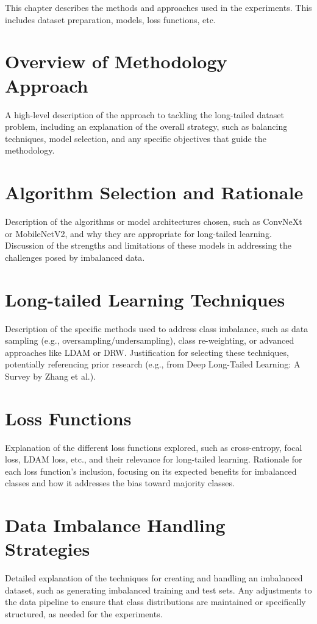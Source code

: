 
This chapter describes the methods and approaches used in the experiments. This includes dataset preparation, models, loss functions, etc.

\section{Overview of Methodology Approach}
A high-level description of the approach to tackling the long-tailed dataset problem, including an explanation of the overall strategy, 
such as balancing techniques, model selection, and any specific objectives that guide the methodology.

\section{Algorithm Selection and Rationale}
Description of the algorithms or model architectures chosen, such as ConvNeXt or MobileNetV2, and why they are appropriate for long-tailed learning.
Discussion of the strengths and limitations of these models in addressing the challenges posed by imbalanced data.

\section{Long-tailed Learning Techniques}
Description of the specific methods used to address class imbalance, such as data sampling (e.g., oversampling/undersampling), class re-weighting, or advanced approaches like LDAM or DRW. 
Justification for selecting these techniques, potentially referencing prior research (e.g., from Deep Long-Tailed Learning: A Survey by Zhang et al.).

\section{Loss Functions}
Explanation of the different loss functions explored, such as cross-entropy, focal loss, LDAM loss, etc., and their relevance for long-tailed learning.
Rationale for each loss function's inclusion, focusing on its expected benefits for imbalanced classes and how it addresses the bias toward majority classes.

\section{Data Imbalance Handling Strategies}
Detailed explanation of the techniques for creating and handling an imbalanced dataset, such as generating imbalanced training and test sets.
Any adjustments to the data pipeline to ensure that class distributions are maintained or specifically structured, as needed for the experiments.

